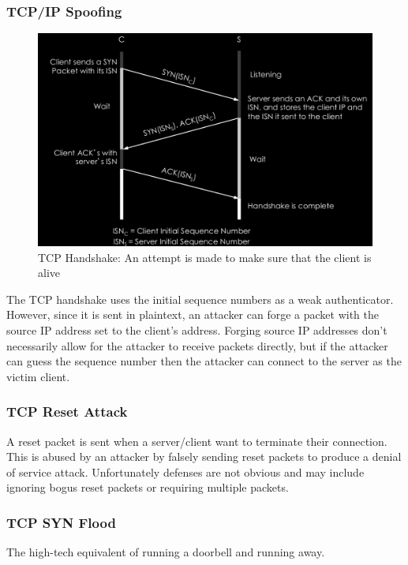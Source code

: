 \documentclass[../notes.tex]{subfiles}
\begin{document}
\subsubsection{TCP/IP Spoofing}

\begin{figure}[H]
    \centering
    \includegraphics[width=0.8\linewidth]{img/image_2023-03-28-16-54-17.png}
    \caption{TCP Handshake: An attempt is made to make sure that the client is alive}
\end{figure}


The TCP handshake uses the initial sequence numbers as a weak authenticator. However, since it is sent in plaintext, an attacker can forge a packet with the source IP address set to the client's address.
Forging source IP addresses don't necessarily allow for the attacker to receive packets directly, but if the attacker can guess the sequence number then the attacker can connect to the server as the victim client.


\subsubsection{TCP Reset Attack}
A reset packet is sent when a server/client want to terminate their connection. This is abused by an attacker by falsely sending reset packets to produce a denial of service attack. 
Unfortunately defenses are not obvious and may include ignoring bogus reset packets or requiring multiple packets.

\subsubsection{TCP SYN Flood}
\begin{blockquote}
    The high-tech equivalent of running a doorbell and running away.
\end{blockquote}
\end{document}
